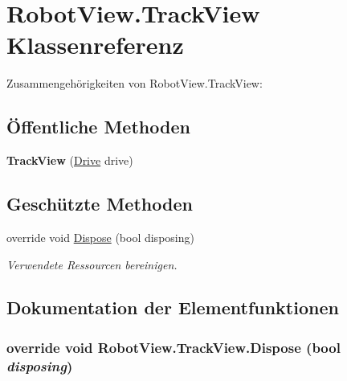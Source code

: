 \hypertarget{class_robot_view_1_1_track_view}{
\section{RobotView.TrackView Klassenreferenz}
\label{class_robot_view_1_1_track_view}
}


Zusammengehörigkeiten von RobotView.TrackView:\subsection*{Öffentliche Methoden}
\begin{DoxyCompactItemize}
\item 
\hypertarget{class_robot_view_1_1_track_view_a0c2477f2b24b1a5b1015c5b4711a56fa}{
{\bfseries TrackView} (\hyperlink{class_robot_ctrl_1_1_drive}{Drive} drive)}
\label{class_robot_view_1_1_track_view_a0c2477f2b24b1a5b1015c5b4711a56fa}

\end{DoxyCompactItemize}
\subsection*{Geschützte Methoden}
\begin{DoxyCompactItemize}
\item 
override void \hyperlink{class_robot_view_1_1_track_view_a7254c3b00294c99a3c8c482f744c47c0}{Dispose} (bool disposing)
\begin{DoxyCompactList}\small\item\em Verwendete Ressourcen bereinigen. \item\end{DoxyCompactList}\end{DoxyCompactItemize}


\subsection{Dokumentation der Elementfunktionen}
\hypertarget{class_robot_view_1_1_track_view_a7254c3b00294c99a3c8c482f744c47c0}{
\subsubsection[{Dispose}]{\setlength{\rightskip}{0pt plus 5cm}override void RobotView.TrackView.Dispose (bool {\em disposing})}}
\label{class_robot_view_1_1_track_view_a7254c3b00294c99a3c8c482f744c47c0}



